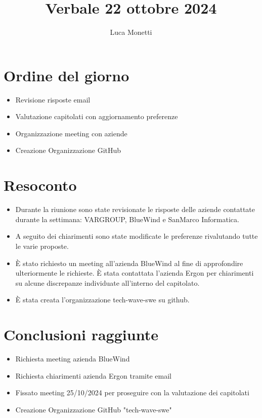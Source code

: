 \documentclass{TWReport}
\title{Verbale 22 ottobre 2024}
\author{Luca Monetti}
\begin{document}
\frontmatter

\showPartecipants

\section*{Ordine del giorno}
\begin{itemize}
    \item Revisione risposte email
    \item Valutazione capitolati con aggiornamento preferenze
    \item Organizzazione meeting con aziende
    \item Creazione Organizzazione GitHub
    
\end{itemize}

\section*{Resoconto}
\begin{itemize}
    \item Durante la riunione sono state revisionate le risposte delle aziende contattate durante la settimana: VARGROUP, BlueWind e SanMarco Informatica.
    \item A seguito dei chiarimenti sono state modificate le preferenze rivalutando tutte le varie proposte. 
    \item È stato richiesto un meeting all’azienda BlueWind al fine di approfondire ulteriormente le richieste.
    È stata contattata l’azienda Ergon per chiarimenti su alcune discrepanze individuate all’interno del capitolato.
    \item È stata creata l’organizzazione tech-wave-swe su github.
    
    
\end{itemize}

\section*{Conclusioni raggiunte}
\begin{itemize}
    \item Richiesta meeting azienda BlueWind
    \item Richiesta chiarimenti azienda Ergon tramite email
    \item Fissato meeting 25/10/2024 per proseguire con la valutazione dei capitolati
    \item Creazione Organizzazione GitHub "tech-wave-swe"
    
\end{itemize}
\end{document}
